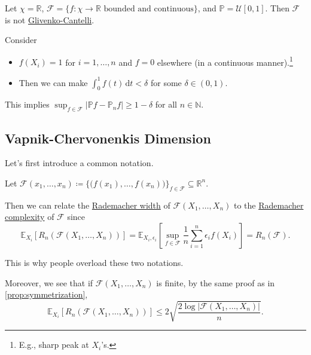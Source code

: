 \begin{eg}
	Let \(\chi = \mathbb{R} \), \(\mathscr{F} = \{ f\colon \chi \to \mathbb{R} \text{ bounded and continuous}\} \), and \(\mathbb{P} = \mathcal{U} [0, 1]\). Then \(\mathscr{F} \) is not \hyperref[def:Glivenko-Cantelli]{Glivenko-Cantelli}.
\end{eg}
\begin{explanation}
	Consider
	\begin{itemize}
		\item \(f(X_i) = 1\) for \(i = 1, \dots , n\) and \(f = 0\) elsewhere (in a continuous manner).\footnote{E.g., sharp peak at \(X_i\)'s.}
		\item Then we can make \(\int_{0}^{1} f(t) \,\mathrm{d}t < \delta \) for some \(\delta \in (0, 1)\).
	\end{itemize}
	This implies \(\sup _{f\in \mathscr{F} } \vert \mathbb{P} f - \mathbb{P} _n f \vert \geq 1 - \delta  \) for all \(n \in \mathbb{N} \).
\end{explanation}

\subsection{Vapnik-Chervonenkis Dimension}
Let's first introduce a common notation.

\begin{notation}
	Let \(\mathscr{F} (x_1, \dots , x_n) \coloneqq \{ \big(f(x_1), \dots , f(x_n)\big) \} _{f\in \mathscr{F} } \subseteq \mathbb{R} ^n\).
\end{notation}

Then we can relate the \hyperref[def:Rademacher-width]{Rademacher width} of \(\mathscr{F} (X_1, \dots , X_n)\) to the \hyperref[def:Rademacher-complexity]{Rademacher complexity} of \(\mathscr{F} \) since
\[
	\mathbb{E}_{X_i}\left[R_n( \mathscr{F} (X_1, \dots , X_n)) \right]
	= \mathbb{E}_{X_i, \epsilon _i}\left[ \sup _{f\in \mathscr{F} }\frac{1}{n}\sum_{i=1}^{n} \epsilon _i f(X_i) \right]
	= R_n(\mathscr{F} ).
\]

\begin{note}
	This is why people overload these two notations.
\end{note}

Moreover, we see that if \(\mathscr{F} (X_1, \dots , X_n)\) is finite, by the same proof as in \autoref{prop:symmetrization},
\[
	\mathbb{E}_{X_i}\left[R_n(\mathscr{F} (X_1, \dots , X_n)) \right]
	\leq 2 \sqrt{\frac{2 \log \vert \mathscr{F} (X_1, \dots , X_n) \vert }{n}} .
\]

